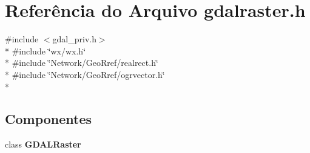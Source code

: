 \section{Referência do Arquivo gdalraster.\+h}
\label{gdalraster_8h}
{\ttfamily \#include $<$gdal\+\_\+priv.\+h$>$}\\*
{\ttfamily \#include \char`\"{}wx/wx.\+h\char`\"{}}\\*
{\ttfamily \#include \char`\"{}Network/\+Geo\+Rref/realrect.\+h\char`\"{}}\\*
{\ttfamily \#include \char`\"{}Network/\+Geo\+Rref/ogrvector.\+h\char`\"{}}\\*
\subsection*{Componentes}
\begin{DoxyCompactItemize}
\item 
class {\bf G\+D\+A\+L\+Raster}
\end{DoxyCompactItemize}
